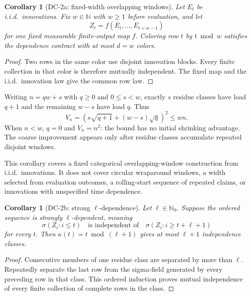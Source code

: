 \documentclass[11pt]{article}
\newtheorem{corollary}[theorem]{Corollary}
\theoremstyle{definition}
\begin{document}
\begin{corollary}[DC-2a: fixed-width overlapping windows]\label{cor:fixed-window}
Let $E_t$ be i.i.d.\ innovations.  Fix $w\in\mathbb{N}$ with $w\ge1$ before evaluation, and let
\begin{equation}
  Z_t=f(E_t,\ldots,E_{t+w-1})
\end{equation}
for one fixed measurable finite-output map $f$.  Coloring row $t$ by $t\bmod w$ satisfies the
dependence contract with at most $d=w$ colors.
\end{corollary}

\begin{proof}
Two rows in the same color use disjoint innovation blocks.  Every finite collection in that color
is therefore mutually independent.  The fixed map and the i.i.d.\ innovation law give the common
row law.
\end{proof}

Writing $n=qw+s$ with $q\ge0$ and $0\le s<w$, exactly $s$ residue classes have load $q+1$ and
the remaining $w-s$ have load $q$.  Thus
\begin{equation}\label{eq:window-load}
  V_n=\left(s\sqrt{q+1}+(w-s)\sqrt q\right)^2\le wn.
\end{equation}
When $n<w$, $q=0$ and $V_n=n^2$: the bound has no initial shrinking advantage.  The coarse
improvement appears only after residue classes accumulate repeated disjoint windows.

This corollary covers a fixed categorical overlapping-window construction from i.i.d.\
innovations.  It does not cover circular wraparound windows, a width selected from evaluation
outcomes, a rolling-start sequence of repeated claims, or innovations with unspecified time
dependence.

\begin{corollary}[DC-2b: strong $\ell$-dependence]\label{cor:strong-dependence}
Let $\ell\in\mathbb{N}_0$.  Suppose the ordered sequence is strongly $\ell$-dependent, meaning
\begin{equation}
  \sigma(Z_i:i\le t)
  \quad\text{is independent of}\quad
  \sigma(Z_i:i\ge t+\ell+1)
\end{equation}
for every $t$.  Then $\kappa(t)=t\bmod(\ell+1)$ gives at most $\ell+1$ independence classes.
\end{corollary}

\begin{proof}
Consecutive members of one residue class are separated by more than $\ell$.  Repeatedly separate
the last row from the sigma-field generated by every preceding row in that class.  This ordered
induction proves mutual independence of every finite collection of complete rows in the class.
\end{proof}
\end{document}
